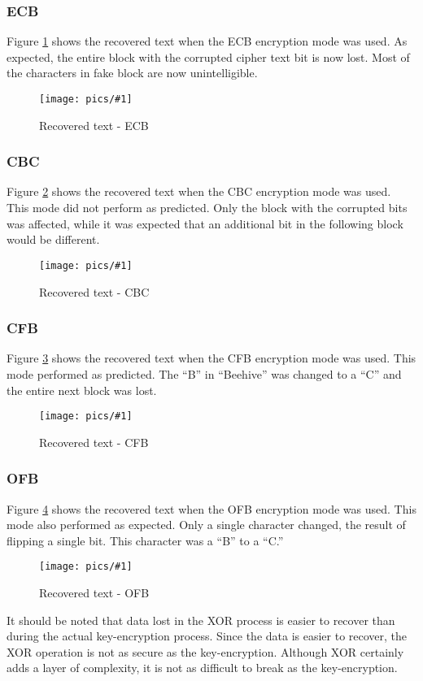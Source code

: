 \documentclass[11pt]{article}
\newcommand{\fig}[2]{ 
\begin{figure}[h]
	\centering
	\caption{#2}
	\texttt{[image: pics/\#1]}
	\label{fig:#1}
\end{figure} 
}
\begin{document}
\subsubsection*{ECB}

Figure \ref{fig:task5.2.1} shows the recovered text when the ECB encryption mode was used. As expected, the entire block with the corrupted cipher text bit is now lost. Most of the characters in fake block are now unintelligible.

\fig{task5.2.1}{Recovered text - ECB}

\subsubsection*{CBC}

Figure \ref{fig:task5.2.2} shows the recovered text when the CBC encryption mode was used. This mode did not perform as predicted. Only the block with the corrupted bits was affected, while it was expected that an additional bit in the following block would be different.

\fig{task5.2.2}{Recovered text - CBC}

\subsubsection*{CFB}

Figure \ref{fig:task5.2.3} shows the recovered text when the CFB encryption mode was used. This mode performed as predicted. The ``B'' in ``Beehive'' was changed to a ``C'' and the entire next block was lost.

\fig{task5.2.3}{Recovered text - CFB}

\subsubsection*{OFB}

Figure \ref{fig:task5.2.4} shows the recovered text when the OFB encryption mode was used. This mode also performed as expected. Only a single character changed, the result of flipping a single bit. This character was a ``B'' to a ``C.''

\fig{task5.2.4}{Recovered text - OFB}

It should be noted that data lost in the XOR process is easier to recover than during the actual key-encryption process. Since the data is easier to recover, the XOR operation is not as secure as the key-encryption. Although XOR certainly adds a layer of complexity, it is not as difficult to break as the key-encryption.
\end{document}
